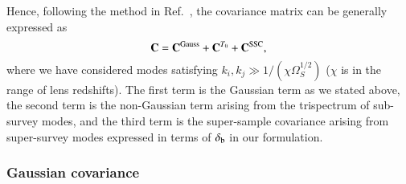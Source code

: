 \documentclass[onecolumn,notitlepage,showpacs,amsmath,amssymb,prd,floatfix]{revtex4-1}
\newcommand{\deltab}{\delta_{\rm b}}
\begin{document}
Hence, following the method in Ref.~\cite{TakadaHu:13}, the covariance
matrix can be generally expressed as
%
\begin{equation}
 {\bf C}={\bf C}^{\rm Gauss}+{\bf C}^{T_0}+{\bf C}^{\rm SSC}, 
\end{equation}
%
where we have considered modes satisfying $k_i,k_j\gg
1/(\chi\Omega_{S}^{1/2})$ ($\chi$ is in the range of lens
redshifts). The first term is the Gaussian term as we stated above, the
second term is the non-Gaussian term arising from the trispectrum of
sub-survey modes, and the third term is the super-sample covariance
arising from super-survey modes expressed in terms of $\deltab$ in our
formulation.

\subsubsection{Gaussian covariance}
\end{document}
